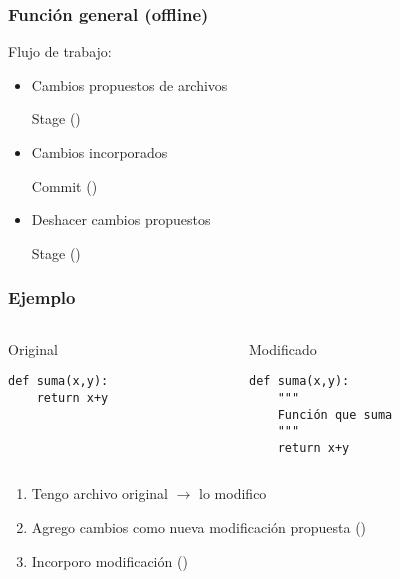 \documentclass[14pt,aspectratio=169,xcolor=dvipsnames]{beamer}
\begin{document}
\begin{frame}\frametitle{Función general (offline)}
    Flujo de trabajo:
    \begin{itemize}
        \item Cambios propuestos de archivos \phantom{ }
            
            \begin{minipage}{0.35\textwidth}
            \begin{block}{}
                Stage \hfill()
            \end{block}
            \end{minipage}

        \item Cambios incorporados \phantom{ }

            \begin{minipage}{0.35\textwidth}
            \begin{block}{}
                Commit \hfill()
            \end{block}
            \end{minipage}

        \item Deshacer cambios propuestos \phantom{ }
            
            \begin{minipage}{0.35\textwidth}
            \begin{block}{}
                Stage \hfill()
            \end{block}
            \end{minipage}

    \end{itemize}
\end{frame}
\begin{frame}[t,fragile]\frametitle{Ejemplo}
  \begin{columns}
    \begin{column}[t]{0.45\textwidth}
        Original
        \begin{verbatim}
def suma(x,y):
    return x+y
        \end{verbatim}
    \end{column}
    \begin{column}[t]{0.45\textwidth}
        Modificado
        \begin{verbatim}
def suma(x,y):
    """
    Función que suma
    """
    return x+y
        \end{verbatim}
    \end{column}
  \end{columns}
    
\begin{enumerate}
    \item Tengo archivo original $\to$ lo modifico
    \item Agrego cambios como nueva modificación propuesta \hfill ()
    \item Incorporo modificación \hfill ()
\end{enumerate}
\end{frame}
\end{document}

